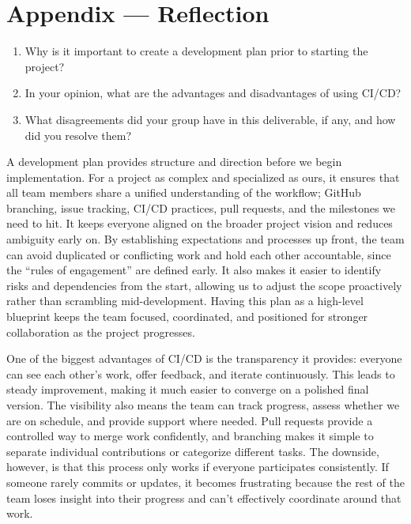 \documentclass{article}
\begin{document}
\newpage{}

\section*{Appendix --- Reflection}


\begin{enumerate}
    \item Why is it important to create a development plan prior to starting the
    project?
    \item In your opinion, what are the advantages and disadvantages of using
    CI/CD?
    \item What disagreements did your group have in this deliverable, if any,
    and how did you resolve them?
\end{enumerate}


\hspace{2em} A development plan provides structure and direction before we begin implementation. For a project as complex and specialized as ours, it ensures that all team members share a unified understanding of the workflow; GitHub branching, issue tracking, CI/CD practices, pull requests, and the milestones we need to hit. It keeps everyone aligned on the broader project vision and reduces ambiguity early on. By establishing expectations and processes up front, the team can avoid duplicated or conflicting work and hold each other accountable, since the “rules of engagement” are defined early. It also makes it easier to identify risks and dependencies from the start, allowing us to adjust the scope proactively rather than scrambling mid-development. Having this plan as a high-level blueprint keeps the team focused, coordinated, and positioned for stronger collaboration as the project progresses.

\hspace{2em} One of the biggest advantages of CI/CD is the transparency it provides: everyone can see each other’s work, offer feedback, and iterate continuously. This leads to steady improvement, making it much easier to converge on a polished final version. The visibility also means the team can track progress, assess whether we are on schedule, and provide support where needed. Pull requests provide a controlled way to merge work confidently, and branching makes it simple to separate individual contributions or categorize different tasks. The downside, however, is that this process only works if everyone participates consistently. If someone rarely commits or updates, it becomes frustrating because the rest of the team loses insight into their progress and can’t effectively coordinate around that work.
\end{document}
